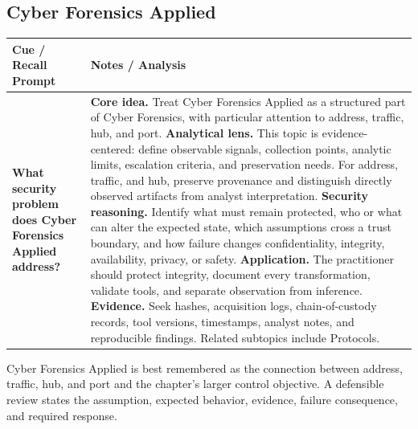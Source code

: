 \documentclass[11pt]{article}
\newcommand{\CornellHeader}{%
\rowcolor{Navy}\color{white}\bfseries Cue / Recall Prompt & \color{white}\bfseries Notes / Analysis\\\hline}
\newcommand{\CornellRow}[2]{%
\cellcolor{CueGray}\RaggedRight\textbf{#1} & \RaggedRight #2\\\hline}
\begin{document}
\subsection*{Cyber Forensics Applied}
\begin{longtable}{>{\RaggedRight\arraybackslash}p{}|>{\RaggedRight\arraybackslash}p{}}
\CornellHeader
\CornellRow{What security problem does Cyber Forensics Applied address?}{\textbf{Core idea.} Treat Cyber Forensics Applied as a structured part of Cyber Forensics, with particular attention to address, traffic, hub, and port. \textbf{Analytical lens.} This topic is evidence-centered: define observable signals, collection points, analytic limits, escalation criteria, and preservation needs. For address, traffic, and hub, preserve provenance and distinguish directly observed artifacts from analyst interpretation. \textbf{Security reasoning.} Identify what must remain protected, who or what can alter the expected state, which assumptions cross a trust boundary, and how failure changes confidentiality, integrity, availability, privacy, or safety. \textbf{Application.} The practitioner should protect integrity, document every transformation, validate tools, and separate observation from inference. \textbf{Evidence.} Seek hashes, acquisition logs, chain-of-custody records, tool versions, timestamps, analyst notes, and reproducible findings. Related subtopics include Protocols.}
\end{longtable}
\begin{topicsummary}
Cyber Forensics Applied is best remembered as the connection between address, traffic, hub, and port and the chapter's larger control objective. A defensible review states the assumption, expected behavior, evidence, failure consequence, and required response.
\end{topicsummary}
\end{document}
